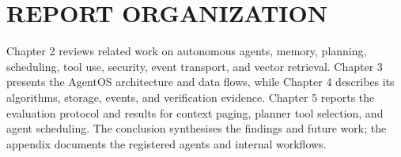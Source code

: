 \section{\uppercase{Report Organization}}
Chapter 2 reviews related work on autonomous agents, memory, planning, scheduling, tool use, security, event transport, and vector retrieval. Chapter 3 presents the AgentOS architecture and data flows, while Chapter 4 describes its algorithms, storage, events, and verification evidence. Chapter 5 reports the evaluation protocol and results for context paging, planner tool selection, and agent scheduling. The conclusion synthesises the findings and future work; the appendix documents the registered agents and internal workflows.
